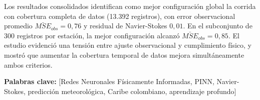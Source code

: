 \begin{flushleft}
Los resultados consolidados identifican como mejor configuración global la corrida con cobertura completa de datos (13.392 registros), con error observacional promedio $\bar{MSE}_{obs}=0{,}76$ y residual de Navier-Stokes $0{,}01$. En el subconjunto de 300 registros por estación, la mejor configuración alcanzó $\bar{MSE}_{obs}=0{,}85$. El estudio evidenció una tensión entre ajuste observacional y cumplimiento físico, y mostró que aumentar la cobertura temporal de datos mejora simultáneamente ambos criterios.

\vspace{1em}
\textbf{Palabras clave:} [Redes Neuronales Físicamente Informadas, PINN, Navier-Stokes, predicción meteorológica, Caribe colombiano, aprendizaje profundo]
\end{flushleft}



